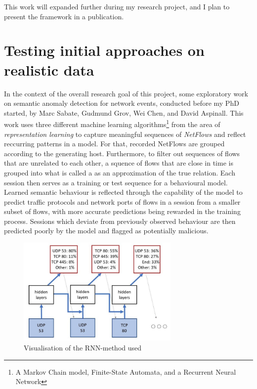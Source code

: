 \documentclass[a4paper,12pt,twoside]{report}
\begin{document}
This work will expanded further during my research project, and I plan to present the framework in a publication. 



\section{Testing initial approaches on realistic data}\label{Prevwork}

In the context of the overall research goal of this project, some exploratory work on semantic anomaly detection for network events, conducted before my PhD started, by Marc Sabate, Gudmund Grov, Wei Chen, and David Aspinall. This work uses three different machine learning algorithms\footnote{A Markov Chain model, Finite-State Automata, and a Recurrent Neural Network} from the area of \textit{representation learning} to capture meaningful sequences of \textit{NetFlows} and reflect reccurring patterns in a model. For that, recorded NetFlows are grouped according to the generating host. Furthermore, to filter out sequences of flows that are unrelated to each other, a squence of flows that are close in time is grouped into what is called a  as an approximation of the true relation. Each session then serves as a training or test sequence for a behavioural model. Learned semantic behaviour is reflected through the capability of the model to predict traffic protocols and network ports of flows in a session from a smaller subset of flows, with more accurate predictions being rewarded in the training process. Sessions which deviate from previously observed behaviour are then predicted poorly by the model and flagged as potentially malicious.

\begin{figure}
\centering
\includegraphics[width=0.7\textwidth]{images/RNN.jpg}
\caption{Visualisation of the RNN-method used}\label{RNN}
\end{figure}
\end{document}
